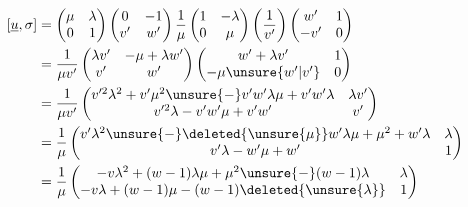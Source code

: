 
\[
\begin{aligned}
{}[\underline u,\sigma]
&=\begin{pmatrix}\mu&\lambda\\0&1\end{pmatrix}
\begin{pmatrix}0&-1\\v'&w'\end{pmatrix}
\frac1\mu\begin{pmatrix}1&-\lambda\\0&\mu\end{pmatrix}
\left(\frac1{v'}\right)\begin{pmatrix}w'&1\\-v'&0\end{pmatrix}\\
&=\frac1{\mu v'}\begin{pmatrix}\lambda v'&-\mu+\lambda w'\\v'&w'\end{pmatrix}
\begin{pmatrix}w'+\lambda v'&1\\-\mu\unsure{w'|v'}&0\end{pmatrix}\\
&=\frac1{\mu v'}\begin{pmatrix}
v'^2\lambda^2+v'\mu^2\unsure{-}v'w'\lambda\mu+v'w'\lambda&\lambda v'\\
v'^2\lambda-v'w'\mu+v'w'&v'
\end{pmatrix}\\
&=\frac1\mu\begin{pmatrix}
v'\lambda^2\unsure{-}\deleted{\unsure{\mu}}w'\lambda\mu+\mu^2+w'\lambda&\lambda\\
v'\lambda-w'\mu+w'&1
\end{pmatrix}\\
&=\frac1\mu\begin{pmatrix}
-v\lambda^2+(w-1)\lambda\mu+\mu^2\unsure{-}(w-1)\lambda&\lambda\\
-v\lambda+(w-1)\mu-(w-1)\deleted{\unsure{\lambda}}&1
\end{pmatrix}
\end{aligned}
\]

